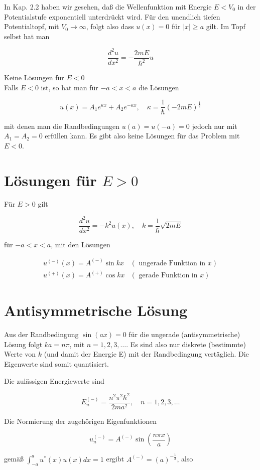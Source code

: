 \documentclass[10pt, letterpaper]{article}
\begin{document}
In Kap. 2.2 haben wir gesehen, daß die Wellenfunktion mit Energie $E<V_{0}$ in der Potentialstufe exponentiell unterdrückt wird. Für den unendlich tiefen Potentialtopf, mit $V_{0} \rightarrow \infty$, folgt also dass $u(x)=0$ für $|x| \geq a$ gilt. Im Topf selbst hat man

$$
\frac{d^{2} u}{d x^{2}}=-\frac{2 m E}{\hbar^{2}} u
$$

Keine Lösungen für $E<0$\\
Falls $E<0$ ist, so hat man für $-a<x<a$ die Lösungen

$$
u(x)=A_{1} e^{\kappa x}+A_{2} e^{-\kappa x}, \quad \kappa=\frac{1}{\hbar}(-2 m E)^{\frac{1}{2}}
$$

mit denen man die Randbedingungen $u(a)=u(-a)=0$ jedoch nur mit $A_{1}=A_{2}=0$ erfüllen kann. Es gibt also keine Lösungen für das Problem mit $E<0$.

\section*{Lösungen für $E>0$}
Für $E>0$ gilt

$$
\frac{d^{2} u}{d x^{2}}=-k^{2} u(x), \quad k=\frac{1}{\hbar} \sqrt{2 m E}
$$

für $-a<x<a$, mit den Lösungen

$$
\begin{array}{ll}
u^{(-)}(x)=A^{(-)} \sin k x & (\text { ungerade Funktion in } x) \\
u^{(+)}(x)=A^{(+)} \cos k x & (\text { gerade Funktion in } x)
\end{array}
$$

\section*{Antisymmetrische Lösung}
Aus der Randbedingung $\sin (a x)=0$ für die ungerade (antisymmetrische) Lösung folgt $k a=n \pi$, mit $n=1,2,3, \ldots$. Es sind also nur diskrete (bestimmte) Werte von $k$ (und damit der Energie E) mit der Randbedingung vertäglich. Die Eigenwerte sind somit quantisiert.

Die zulässigen Energiewerte sind

$$
E_{n}^{(-)}=\frac{n^{2} \pi^{2} \hbar^{2}}{2 m a^{2}}, \quad n=1,2,3, \ldots
$$

Die Normierung der zugehörigen Eigenfunktionen

$$
u_{n}^{(-)}=A^{(-)} \sin \left(\frac{n \pi x}{a}\right)
$$

gemäß $\int_{-a}^{a} u^{*}(x) u(x) d x=1$ ergibt $A^{(-)}=(a)^{-\frac{1}{2}}$, also
\end{document}
